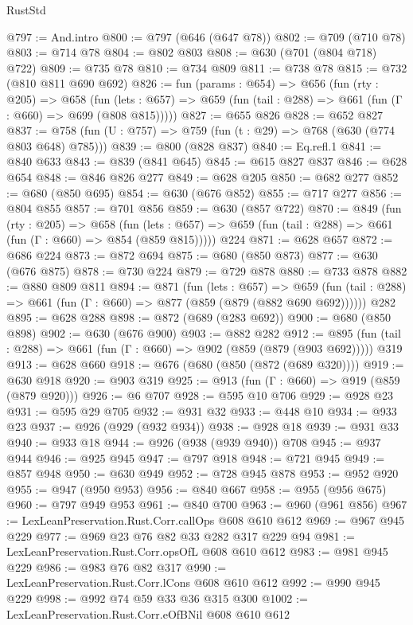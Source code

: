 \begin{lexlean}{RustStd}
\begin{coremodule}
@797 := And.intro
@800 := @797 (@646 (@647 @78))
@802 := @709 (@710 @78)
@803 := @714 @78
@804 := @802 @803
@808 := @630 (@701 (@804 @718) @722)
@809 := @735 @78
@810 := @734 @809
@811 := @738 @78
@815 := @732 (@810 @811 @690 @692)
@826 := fun (params : @654) =>
  @656
    (fun (rty : @205) =>
    @658
      (fun (lets : @657) => @659 (fun (tail : @288) => @661 (fun (Γ : @660) => @699 (@808 @815)))))
@827 := @655 @826
@828 := @652 @827
@837 := @758 (fun (U : @757) => @759 (fun (t : @29) => @768 (@630 (@774 @803 @648) @785)))
@839 := @800 (@828 @837)
@840 := Eq.refl.{1}
@841 := @840 @633
@843 := @839 (@841 @645)
@845 := @615 @827 @837
@846 := @628 @654
@848 := @846 @826 @277
@849 := @628 @205
@850 := @682 @277
@852 := @680 (@850 @695)
@854 := @630 (@676 @852)
@855 := @717 @277
@856 := @804 @855
@857 := @701 @856
@859 := @630 (@857 @722)
@870 := @849
    (fun (rty : @205) =>
    @658
      (fun (lets : @657) => @659 (fun (tail : @288) => @661 (fun (Γ : @660) => @854 (@859 @815)))))
    @224
@871 := @628 @657
@872 := @686 @224
@873 := @872 @694
@875 := @680 (@850 @873)
@877 := @630 (@676 @875)
@878 := @730 @224
@879 := @729 @878
@880 := @733 @878
@882 := @880 @809 @811
@894 := @871
    (fun (lets : @657) =>
    @659 (fun (tail : @288) => @661 (fun (Γ : @660) => @877 (@859 (@879 (@882 @690 @692))))))
    @282
@895 := @628 @288
@898 := @872 (@689 (@283 @692))
@900 := @680 (@850 @898)
@902 := @630 (@676 @900)
@903 := @882 @282
@912 := @895 (fun (tail : @288) => @661 (fun (Γ : @660) => @902 (@859 (@879 (@903 @692))))) @319
@913 := @628 @660
@918 := @676 (@680 (@850 (@872 (@689 @320))))
@919 := @630 @918
@920 := @903 @319
@925 := @913 (fun (Γ : @660) => @919 (@859 (@879 @920)))
@926 := @6 @707
@928 := @595 @10 @706
@929 := @928 @23
@931 := @595 @29 @705
@932 := @931 @32
@933 := @448 @10
@934 := @933 @23
@937 := @926 (@929 (@932 @934))
@938 := @928 @18
@939 := @931 @33
@940 := @933 @18
@944 := @926 (@938 (@939 @940)) @708
@945 := @937 @944
@946 := @925 @945
@947 := @797 @918
@948 := @721 @945
@949 := @857 @948
@950 := @630 @949
@952 := @728 @945 @878
@953 := @952 @920
@955 := @947 (@950 @953)
@956 := @840 @667
@958 := @955 (@956 @675)
@960 := @797 @949 @953
@961 := @840 @700
@963 := @960 (@961 @856)
@967 := LexLeanPreservation.Rust.Corr.callOps @608 @610 @612
@969 := @967 @945 @229
@977 := @969 @23 @76 @82 @33 @282 @317 @229 @94
@981 := LexLeanPreservation.Rust.Corr.opsOfL @608 @610 @612
@983 := @981 @945 @229
@986 := @983 @76 @82 @317
@990 := LexLeanPreservation.Rust.Corr.lCons @608 @610 @612
@992 := @990 @945 @229
@998 := @992 @74 @59 @33 @36 @315 @300
@1002 := LexLeanPreservation.Rust.Corr.eOfBNil @608 @610 @612

\end{coremodule}
\end{lexlean}

